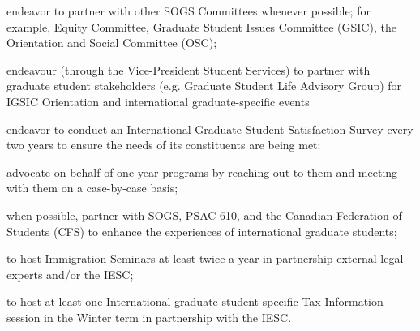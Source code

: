 \begin{longenum}[ label*=\thesubsection.\arabic*., align=left]
\begin{longenum}[ label*=\arabic*., align=left]
	\item endeavor to partner with other SOGS Committees whenever possible; for example, Equity Committee, Graduate Student Issues Committee (GSIC), the Orientation and Social Committee (OSC);
	\item endeavour (through the Vice-President Student Services) to partner with graduate student stakeholders (e.g. Graduate Student Life Advisory Group) for IGSIC Orientation and international graduate-specific events
	\item endeavor to conduct an International Graduate Student Satisfaction Survey every two years to ensure the needs of its constituents are being met:
		\begin{longenum}[ label*=\arabic*., align=left]
		\item advocate on behalf of one-year programs by reaching out to them and meeting with them on a case-by-case basis;
		\item when possible, partner with SOGS, PSAC 610, and the Canadian Federation of Students (CFS) to enhance the experiences of international graduate students;
		\item to host Immigration Seminars at least twice a year in partnership external legal experts and/or the IESC;
		\item to host at least one International graduate student specific Tax Information session in the Winter term in partnership with the IESC.
		\end{longenum}
	\end{longenum}
\end{longenum}